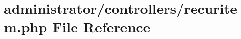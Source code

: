 \section{administrator/controllers/recuritem.php File Reference}
\label{controllers_2recuritem_8php}
